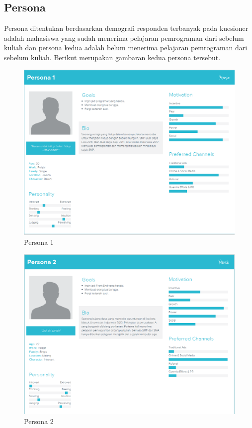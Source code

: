 	\subsection{Persona}
	Persona ditentukan berdasarkan demografi responden terbanyak pada kuesioner adalah mahasiswa yang sudah menerima pelajaran pemrograman dari sebelum kuliah dan persona kedua adalah belum menerima pelajaran pemrograman dari sebelum kuliah. Berikut merupakan gambaran kedua persona tersebut.
	\begin{figure}
		\includegraphics[width=\linewidth]{pics/pesona1}
		\caption{Persona 1}
		\centering
	\end{figure}
	\begin{figure}
		\includegraphics[width=\linewidth]{pics/pesona2}
		\caption{Persona 2}
		\centering
	\end{figure}
